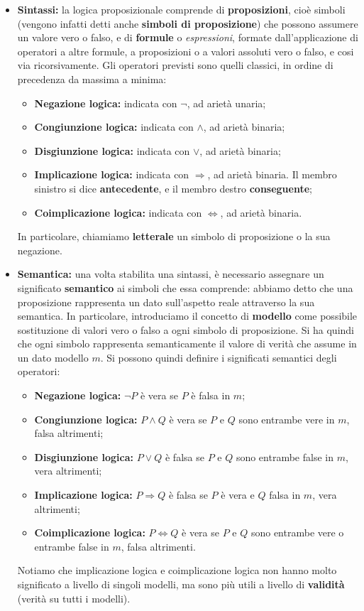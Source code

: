 \documentclass[a4paper,11pt]{article}
\begin{document}
\begin{itemize}
	\item \textbf{Sintassi:}
		la logica proposizionale comprende di \textbf{proposizioni}, cioè simboli (vengono infatti detti anche \textbf{simboli di proposizione}) che possono assumere un valore vero o falso, e di \textbf{formule} o \textit{espressioni}, formate dall'applicazione di operatori a altre formule, a proposizioni o a valori assoluti vero o falso, e cosi via ricorsivamente.
		Gli operatori previsti sono quelli classici, in ordine di precedenza da massima a minima:
		\begin{itemize}
			\item \textbf{Negazione logica:} indicata con $\neg$, ad arietà unaria;
			\item \textbf{Congiunzione logica:} indicata con $\wedge$, ad arietà binaria;
			\item \textbf{Disgiunzione logica:} indicata con $\vee$, ad arietà binaria;
			\item \textbf{Implicazione logica:} indicata con $\Rightarrow$, ad arietà binaria. Il membro sinistro si dice \textbf{antecedente}, e il membro destro \textbf{conseguente};
			\item \textbf{Coimplicazione logica:} indicata con $\Leftrightarrow$, ad arietà binaria. 
		\end{itemize}
		In particolare, chiamiamo \textbf{letterale} un simbolo di proposizione o la sua negazione.
	\item \textbf{Semantica:}
		una volta stabilita una sintassi, è necessario assegnare un significato \textbf{semantico} ai simboli che essa comprende: abbiamo detto che una proposizione rappresenta un dato sull'aspetto reale attraverso la sua semantica.
		In particolare, introduciamo il concetto di \textbf{modello} come possibile sostituzione di valori vero o falso a ogni simbolo di proposizione.
		Si ha quindi che ogni simbolo rappresenta semanticamente il valore di verità che assume in un dato modello $m$.
		Si possono quindi definire i significati semantici degli operatori:
		\begin{itemize}
			\item \textbf{Negazione logica:} $\neg P$ è vera se $P$ è falsa in $m$;
			\item \textbf{Congiunzione logica:} $P \wedge Q$ è vera se $P$ e $Q$ sono entrambe vere in $m$, falsa altrimenti;
			\item \textbf{Disgiunzione logica:} $P \vee Q$ è falsa se $P$ e $Q$ sono entrambe false in $m$, vera altrimenti;
			\item \textbf{Implicazione logica:} $P \Rightarrow Q$ è falsa se $P$ è vera e $Q$ falsa in $m$, vera altrimenti;
			\item \textbf{Coimplicazione logica:} $P \Leftrightarrow Q$ è vera se $P$ e $Q$ sono entrambe vere o entrambe false in $m$, falsa altrimenti.
		\end{itemize}
		Notiamo che implicazione logica e coimplicazione logica non hanno molto significato a livello di singoli modelli, ma sono più utili a livello di \textbf{validità} (verità su tutti i modelli).


\end{itemize}
\end{document}
